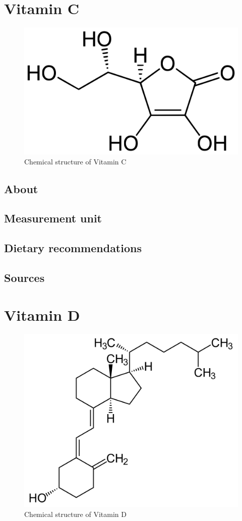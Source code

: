 \documentclass{book}
\begin{document}
\chapter{Vitamin C}
\begin{figure}[h]
	\centering \includegraphics[width=0.75\linewidth]{images/Vitamin_C_chemical_structure}
	\caption{Chemical structure of Vitamin C}
\end{figure}

\section{About}


\section{Measurement unit}


\section{Dietary recommendations}


\section{Sources}


\chapter{Vitamin D}
\begin{figure}[h]
	\centering \includegraphics[width=0.75\linewidth]{images/Vitamin_D_chemical_structure}
	\caption{Chemical structure of Vitamin D}
\end{figure}
\end{document}
